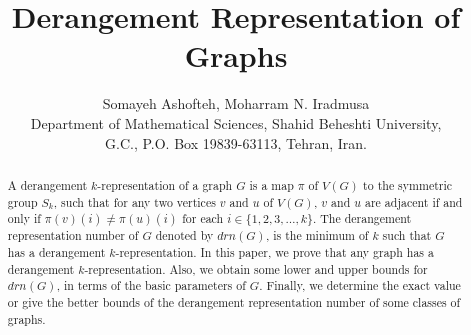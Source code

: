 \documentclass[11pt,letterpaper]{article}
\begin{document}
\title{Derangement Representation of Graphs}
{\small
	\author{Somayeh Ashofteh, Moharram N. Iradmusa\\
		{\small Department of Mathematical Sciences, Shahid Beheshti University,}\\
		{\small G.C., P.O. Box 19839-63113, Tehran, Iran.}}

\maketitle
\begin{abstract}
A derangement $k$-representation of a graph $G$  is a map $\pi$ of $V(G)$ to the symmetric group $S_k$, such that for any two vertices $v$ and $u$ of $V(G)$, $v $ and $u$ are adjacent if and only if $\pi(v)(i) \neq \pi(u)(i)$ for each $i \in \{1,2,3,\ldots,k\}$. The derangement representation number of $G$ denoted by  $drn(G)$, is the minimum of $k$ such that $G$ has a derangement $k$-representation. In this paper, we prove that any graph has a derangement $k$-representation. Also, we obtain some lower and upper bounds for $drn(G)$, in terms of the basic parameters of $G$. Finally, we determine the exact value or give the better bounds of the derangement representation number of some classes of graphs.
\end{abstract}

}
\end{document}

